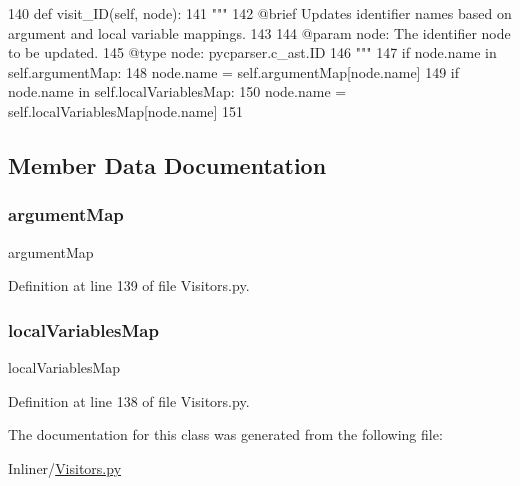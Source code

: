 \begin{DoxyCode}
140     \textcolor{keyword}{def }visit\_ID(self, node):
141         \textcolor{stringliteral}{"""
}
142 \textcolor{stringliteral}{        @brief Updates identifier names based on argument and local variable mappings.
}
143 \textcolor{stringliteral}{
}
144 \textcolor{stringliteral}{        @param node: The identifier node to be updated.
}
145 \textcolor{stringliteral}{        @type node: pycparser.c\_ast.ID
}
146 \textcolor{stringliteral}{        """}
147         \textcolor{keywordflow}{if} node.name \textcolor{keywordflow}{in} self.argumentMap:
148             node.name = self.argumentMap[node.name]
149         \textcolor{keywordflow}{if} node.name \textcolor{keywordflow}{in} self.localVariablesMap:
150             node.name = self.localVariablesMap[node.name]
151 
\end{DoxyCode}


\subsection{Member Data Documentation}
\mbox{\label{classVisitors_1_1IdVisitor_a976941a4c7ae422cebf58ddfd2e8b479}} 
\subsubsection{\texorpdfstring{argument\+Map}{argumentMap}}
{\footnotesize\ttfamily argument\+Map}



Definition at line 139 of file Visitors.\+py.

\mbox{\label{classVisitors_1_1IdVisitor_ad7cca8103c884420bac50cbb68183848}} 
\subsubsection{\texorpdfstring{local\+Variables\+Map}{localVariablesMap}}
{\footnotesize\ttfamily local\+Variables\+Map}



Definition at line 138 of file Visitors.\+py.



The documentation for this class was generated from the following file\+:\begin{DoxyCompactItemize}
\item 
Inliner/\hyperlink{Visitors_8py}{Visitors.\+py}\end{DoxyCompactItemize}
